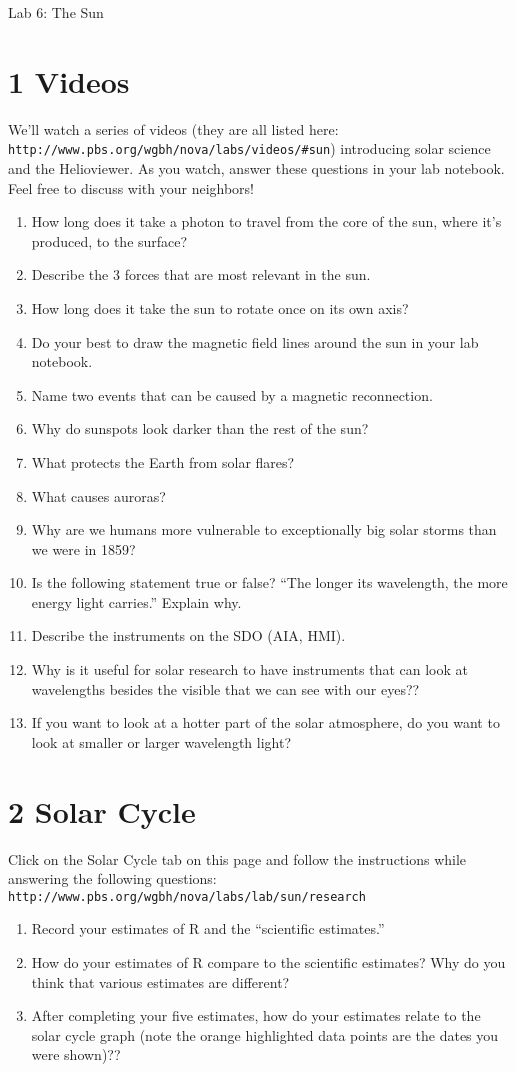 \documentclass[11pt]{article}%
\begin{document}
\begin{center}
\huge Lab 6: The Sun
\end{center}
	

\section*{1 Videos}
We'll watch a series of videos (they are all listed here: {\tt http://www.pbs.org/wgbh/nova/labs/videos/\#sun}) introducing solar science and the Helioviewer. As you watch, answer these questions in your lab notebook. Feel free to discuss with your neighbors!
\begin{enumerate}
\item How long does it take a photon to travel from the core of the sun, where it's produced, to the surface?
\item Describe the 3 forces that are most relevant in the sun.
\item How long does it take the sun to rotate once on its own axis?
\item Do your best to draw the magnetic field lines around the sun in your lab notebook. 
\item Name two events that can be caused by a magnetic reconnection.
\item Why do sunspots look darker than the rest of the sun?
\item What protects the Earth from solar flares?
\item What causes auroras?
\item Why are we humans more vulnerable to exceptionally big solar storms than we were in 1859?
\item Is the following statement true or false? ``The longer its wavelength, the more energy light carries.'' Explain why.
\item Describe the instruments on the SDO (AIA, HMI).
\item Why is it useful for solar research to have instruments that can look at wavelengths besides the visible that we can see with our eyes??\item If you want to look at a hotter part of the solar atmosphere, do you want to look at smaller or larger wavelength light?
\end{enumerate}

\section*{2 Solar Cycle}
Click on the Solar Cycle tab on this page and follow the instructions while answering the following questions: {\tt http://www.pbs.org/wgbh/nova/labs/lab/sun/research}
\begin{enumerate}
\item Record your estimates of R and the ``scientific estimates.''
 \item How do your estimates of R compare to the scientific estimates? Why do you think that various estimates are different?
 \item  After completing your five estimates, how do your estimates relate to the solar cycle graph (note the orange highlighted data points are the dates you were shown)??\end{enumerate}
\end{document}
